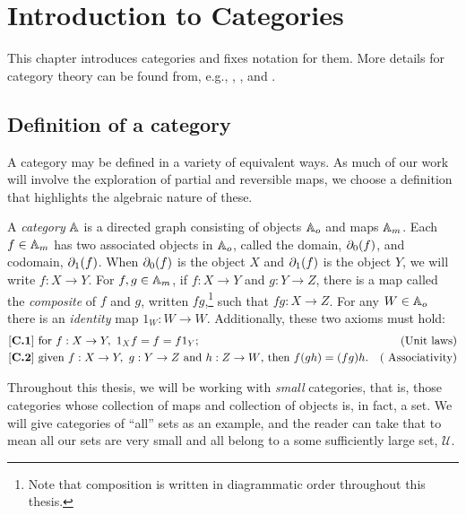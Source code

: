 
\chapter{Introduction to Categories}\label{chap:introduction_to_categories}

This chapter introduces categories and fixes notation for them. More
details for category theory can be found from, e.g., \cite{barr:ctcs}, \cite{cockett2009:ctcs},
\cite{maclan97:categorieswrkmath} and \cite{various:nlab}.

\section{Definition of a category}
\label{sec:definition_of_a_category}


A category may be defined in a variety of equivalent ways. As much of our work will involve the
exploration of partial and reversible maps, we choose a definition that highlights the algebraic
nature of these.

\begin{definition}\label{def:category}
  A \emph{category} $\mathbb{A}$ is a directed graph consisting of objects ${\mathbb{A}}_o$ and maps ${\mathbb{A}}_m$. Each $f\in
  {\ensuremath{\mathbb{A}}}_m$ has two associated objects in ${\mathbb{A}}_o$, called the domain, $\partial_0({f})$, and codomain,
  $\partial_1({f})$. When $\partial_0({f})$ is the object $X$  and $\partial_1({f})$ is the object $Y$, we
  will write $f:X \to Y$. For $f, g \in \mathbb{A}_m$, if $f:X\to Y$ and $g:Y \to Z$, there is a map called
  the \emph{composite} of $f$ and $g$, written $f g$,\footnote{Note that composition is written in
    diagrammatic order throughout this thesis.} such that $f g:X \to Z$. For any $W \in \mathbb{A}_o$ there is
  an \emph{identity} map $1_W:W \to W$. Additionally, these two axioms must hold:
  \begin{align*}
    \catone &\text{ for }f:X \to Y,\ 1_X f = f = f 1_Y;&\text{(Unit laws)}\\
    \cattwo &\text{ given }f:X \to Y,\ g:Y \to Z\text{ and }h: Z\to W\text{, then }f (g h) = (f g) h.&\text{( Associativity)}
  \end{align*}
\end{definition}

Throughout   this thesis, we will be working with \emph{small} categories, that is, those categories
whose collection of maps and collection of objects is, in fact, a set. We will give categories of
``all'' sets as an example, and the reader can take that to mean all our sets are very small and all
belong to a some sufficiently large set, $\mathcal{U}$.


